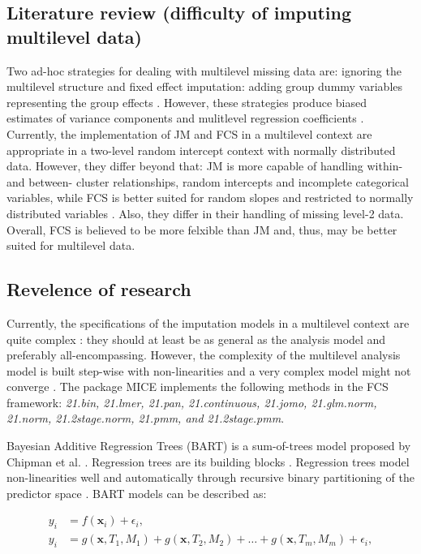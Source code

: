 \documentclass[10pt, a4paper, titlepage]{article}
\begin{document}
\subsection{Literature review (difficulty of imputing multilevel data)}
Two ad-hoc strategies for dealing with multilevel missing data are: ignoring the multilevel structure and fixed effect imputation: adding group dummy variables representing the group effects \cite{ludtke2017, enders2016}. However, these strategies produce biased estimates of variance components and mulitlevel regression coefficients \cite{ludtke2017}. Currently, the implementation of JM and FCS in a multilevel context are appropriate in a two-level random intercept context with normally distributed data. However, they differ beyond that: JM is more capable of handling within- and between- cluster relationships, random intercepts and incomplete categorical variables, while FCS is better suited for random slopes and restricted to normally distributed variables \cite{enders2016}. Also, they differ in their handling of missing level-2 data. Overall, FCS is believed to be more felxible than JM \cite{audigier2018} and, thus, may be better suited for multilevel data.

\subsection{Revelence of research}
Currently, the specifications of the imputation models in a multilevel context are quite complex \cite{buurenFlexibleImputationMissing2018}: they should at least be as general as the analysis model \cite{grund2018} and preferably all-encompassing. However, the complexity of the multilevel analysis model is built step-wise with non-linearities \cite{hox2017} and a very complex model might not converge \cite{buurenFlexibleImputationMissing2018}. The package MICE \cite{buuren2011} implements the following methods in the FCS framework: \textit{21.bin, 21.lmer, 21.pan, 21.continuous, 21.jomo, 21.glm.norm, 21.norm, 21.2stage.norm, 21.pmm, and 21.2stage.pmm}.

Bayesian Additive Regression Trees (BART) is a sum-of-trees model proposed by Chipman et al. \cite{chipman2010}. Regression trees are its building blocks \cite{chipman2010, hill2020}. Regression trees model non-linearities well and automatically through recursive binary partitioning of the predictor space \cite{hill2020}. BART models can be described as:

\begin{subequations}
\label{eq:population}
\begin{align}
y_i &= f(\textbf{x}_i) + \epsilon_i, \tag{1} \\
y_i &= g(\textbf{x}, T_{1}, M_{1})+ g(\textbf{x}, T_{2}, M_{2}) + \dots + g(\textbf{x}, T_{m}, M_{m}) + \epsilon_i, \tag{2}
\end{align}
\end{subequations}
\end{document}
